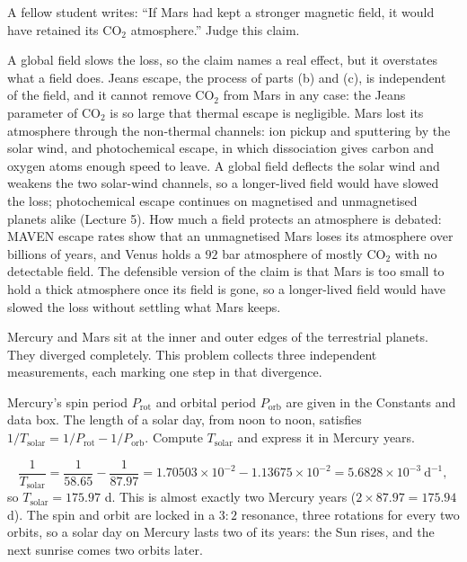 \parti A fellow student writes: ``If Mars had kept a stronger magnetic field, it would have retained its $\mathrm{CO_2}$ atmosphere.''
Judge this claim.

\begin{solution}
A global field slows the loss, so the claim names a real effect, but it overstates what a field does.
Jeans escape, the process of parts (b) and (c), is independent of the field, and it cannot remove $\mathrm{CO_2}$ from Mars in any case: the Jeans parameter of $\mathrm{CO_2}$ is so large that thermal escape is negligible.
Mars lost its atmosphere through the non-thermal channels: ion pickup and sputtering by the solar wind, and photochemical escape, in which dissociation gives carbon and oxygen atoms enough speed to leave.
A global field deflects the solar wind and weakens the two solar-wind channels, so a longer-lived field would have slowed the loss; photochemical escape continues on magnetised and unmagnetised planets alike (Lecture 5).
How much a field protects an atmosphere is debated: MAVEN escape rates show that an unmagnetised Mars loses its atmosphere over billions of years, and Venus holds a $92$ bar atmosphere of mostly $\mathrm{CO_2}$ with no detectable field.
The defensible version of the claim is that Mars is too small to hold a thick atmosphere once its field is gone, so a longer-lived field would have slowed the loss without settling what Mars keeps.
\end{solution}



Mercury and Mars sit at the inner and outer edges of the terrestrial planets. They diverged completely.
This problem collects three independent measurements, each marking one step in that divergence.

\parti Mercury's spin period $P_\mathrm{rot}$ and orbital period $P_\mathrm{orb}$ are given in the Constants and data box.
The length of a solar day, from noon to noon, satisfies $1/T_\mathrm{solar} = 1/P_\mathrm{rot} - 1/P_\mathrm{orb}$.
Compute $T_\mathrm{solar}$ and express it in Mercury years.

\begin{solution}
\[
\frac{1}{T_\mathrm{solar}} = \frac{1}{58.65} - \frac{1}{87.97}
= 1.70503\times10^{-2} - 1.13675\times10^{-2} = 5.6828\times10^{-3}\ \mathrm{d^{-1}},
\]
so $T_\mathrm{solar} = 175.97$ d.
This is almost exactly two Mercury years ($2 \times 87.97 = 175.94$ d).
The spin and orbit are locked in a $3\!:\!2$ resonance, three rotations for every two orbits,
so a solar day on Mercury lasts two of its years: the Sun rises, and the next sunrise comes two orbits later.
\end{solution}

